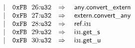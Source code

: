 $$\begin{array}[t]{@{}lrrl@{}l@{}l@{}l@{}}
& & | & \mathtt{0xFB}~~26{:}{\mathtt{u32}} & \quad\Rightarrow\quad{} & \mathsf{any{.}convert\_extern} \\
& & | & \mathtt{0xFB}~~27{:}{\mathtt{u32}} & \quad\Rightarrow\quad{} & \mathsf{extern{.}convert\_any} \\
& & | & \mathtt{0xFB}~~28{:}{\mathtt{u32}} & \quad\Rightarrow\quad{} & \mathsf{ref{.}i{\scriptstyle 31}} \\
& & | & \mathtt{0xFB}~~29{:}{\mathtt{u32}} & \quad\Rightarrow\quad{} & {\mathsf{i{\scriptstyle 31}{.}get}}{\mathsf{\_}}{\mathsf{s}} \\
& & | & \mathtt{0xFB}~~30{:}{\mathtt{u32}} & \quad\Rightarrow\quad{} & {\mathsf{i{\scriptstyle 31}{.}get}}{\mathsf{\_}}{\mathsf{u}} \\
\end{array}
$$

\vspace{1ex}

